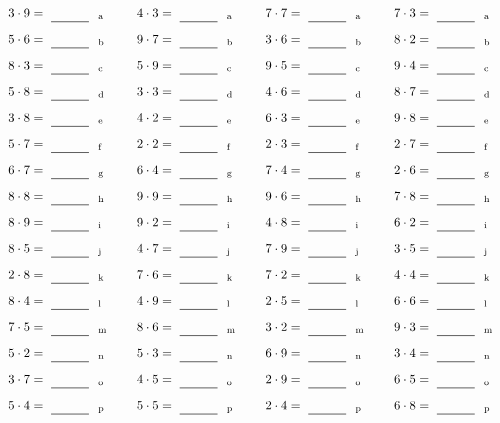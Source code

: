 \documentclass
[
  draft    = true,
  fontsize = 11pt,
  parskip  = half-
]
{scrartcl}
\begin{document}
\par\vfill\par
\begin{align*}
    \pline{3\cdot9}&=\rline{a}
  & \pline{4\cdot3}&=\rline{a}
  & \pline{7\cdot7}&=\rline{a}
  & \pline{7\cdot3}&=\rline{a} \\[1ex]
    \pline{5\cdot6}&=\rline{b}
  & \pline{9\cdot7}&=\rline{b}
  & \pline{3\cdot6}&=\rline{b}
  & \pline{8\cdot2}&=\rline{b} \\[1ex]
    \pline{8\cdot3}&=\rline{c}
  & \pline{5\cdot9}&=\rline{c}
  & \pline{9\cdot5}&=\rline{c}
  & \pline{9\cdot4}&=\rline{c} \\[1ex]
    \pline{5\cdot8}&=\rline{d}
  & \pline{3\cdot3}&=\rline{d}
  & \pline{4\cdot6}&=\rline{d}
  & \pline{8\cdot7}&=\rline{d} \\[1ex]
    \pline{3\cdot8}&=\rline{e}
  & \pline{4\cdot2}&=\rline{e}
  & \pline{6\cdot3}&=\rline{e}
  & \pline{9\cdot8}&=\rline{e} \\[1ex]
    \pline{5\cdot7}&=\rline{f}
  & \pline{2\cdot2}&=\rline{f}
  & \pline{2\cdot3}&=\rline{f}
  & \pline{2\cdot7}&=\rline{f} \\[1ex]
    \pline{6\cdot7}&=\rline{g}
  & \pline{6\cdot4}&=\rline{g}
  & \pline{7\cdot4}&=\rline{g}
  & \pline{2\cdot6}&=\rline{g} \\[1ex]
    \pline{8\cdot8}&=\rline{h}
  & \pline{9\cdot9}&=\rline{h}
  & \pline{9\cdot6}&=\rline{h}
  & \pline{7\cdot8}&=\rline{h} \\[1ex]
    \pline{8\cdot9}&=\rline{i}
  & \pline{9\cdot2}&=\rline{i}
  & \pline{4\cdot8}&=\rline{i}
  & \pline{6\cdot2}&=\rline{i} \\[1ex]
    \pline{8\cdot5}&=\rline{j}
  & \pline{4\cdot7}&=\rline{j}
  & \pline{7\cdot9}&=\rline{j}
  & \pline{3\cdot5}&=\rline{j} \\[1ex]
    \pline{2\cdot8}&=\rline{k}
  & \pline{7\cdot6}&=\rline{k}
  & \pline{7\cdot2}&=\rline{k}
  & \pline{4\cdot4}&=\rline{k} \\[1ex]
    \pline{8\cdot4}&=\rline{l}
  & \pline{4\cdot9}&=\rline{l}
  & \pline{2\cdot5}&=\rline{l}
  & \pline{6\cdot6}&=\rline{l} \\[1ex]
    \pline{7\cdot5}&=\rline{m}
  & \pline{8\cdot6}&=\rline{m}
  & \pline{3\cdot2}&=\rline{m}
  & \pline{9\cdot3}&=\rline{m} \\[1ex]
    \pline{5\cdot2}&=\rline{n}
  & \pline{5\cdot3}&=\rline{n}
  & \pline{6\cdot9}&=\rline{n}
  & \pline{3\cdot4}&=\rline{n} \\[1ex]
    \pline{3\cdot7}&=\rline{o}
  & \pline{4\cdot5}&=\rline{o}
  & \pline{2\cdot9}&=\rline{o}
  & \pline{6\cdot5}&=\rline{o} \\[1ex]
    \pline{5\cdot4}&=\rline{p}
  & \pline{5\cdot5}&=\rline{p}
  & \pline{2\cdot4}&=\rline{p}
  & \pline{6\cdot8}&=\rline{p}
\end{align*}
\end{document}
